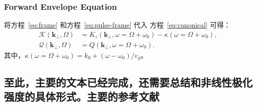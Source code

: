 \documentclass[a4paper,12pt]{ctexart}
\numberwithin{equation}{section}
\newcommand{\vect}[1]{\bm{#1}}
\begin{document}
\subsubsection{Forward Envelope Equation}
将方程~\eqref{eq:frame} 和方程~\eqref{eq:pulse-frame} 代入
方程~\eqref{eq:canonical} 可得：
\begin{equation}
  \begin{aligned}
    \mathcal{K}(\vect{k}_\perp,\Omega)
     & =K_z(\vect{k}_\perp,\omega=\Omega+\omega_0)
    -\kappa(\omega=\Omega+\omega_0),               \\
    \mathcal{Q}(\vect{k}_\perp,\Omega)
     & =Q(\vect{k}_\perp,\omega=\Omega+\omega_0).
  \end{aligned}
\end{equation}
其中，$\kappa(\omega=\Omega+\omega_0)=k_0+(\omega-\omega_0)/v_g$。

\subsection{至此，主要的文本已经完成，还需要总结和非线性极化强度的具体形式。主要的参考文献\cite{couairon_practitioners_2011}}

\printbibliography[title={参考文献}]
\end{document}
